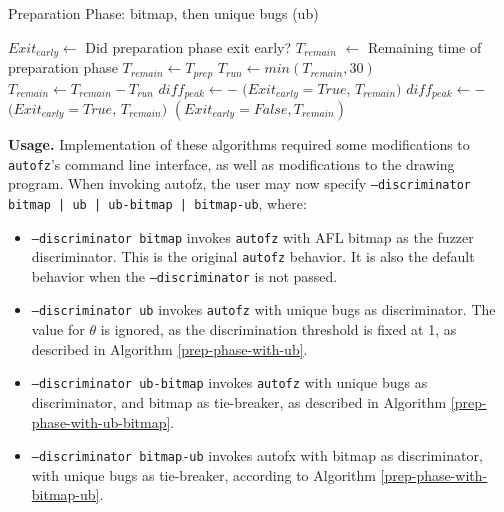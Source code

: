 \begin{algorithm}[h!]
  \caption{Preparation Phase: bitmap, then unique bugs (ub)}\label{prep-phase-with-bitmap-ub}
  \small
  \begin{algorithmic}[1]
    \Output
      \State $Exit_{early} \gets$ Did preparation phase exit early?
      \State $T_{remain}$ $\gets$ Remaining time of preparation phase
    \EndOutput
      \State $T_{remain} \gets T_{prep}$
        \State $T_{run} \gets min(T_{remain},30)$
            \State {}
          \EndFor
        \Else {}
          \State {}
        \EndIf
        \State $T_{remain} \gets T_{remain} - T_{run}$
        \State $diff_{peak} \gets $$ - $
          \State \Return $(Exit_{early}=True$, $T_{remain})$
        \Else {}
          \State $diff_{peak} \gets $$ - $
              \State \Return $(Exit_{early}=True$, $T_{remain})$
          \EndIf
        \EndIf
      \EndWhile
      \State \Return $(Exit_{early}=False, T_{remain})$
    \EndFunction
  \end{algorithmic}
\end{algorithm}

\textbf{Usage.} Implementation of these algorithms required some modifications to \texttt{autofz}'s 
command line interface, as well as modifications to the drawing program. When invoking 
autofz, the user may now specify \texttt{--discriminator bitmap | ub | ub-bitmap | bitmap-ub},
where:

\begin{itemize}
  \item \texttt{--discriminator bitmap} invokes \texttt{autofz} with AFL bitmap as the 
  fuzzer discriminator. This is the original \texttt{autofz} behavior. It is also the default behavior 
  when the \texttt{--discriminator} is not passed.
  \item \texttt{--discriminator ub} invokes \texttt{autofz} with unique bugs as discriminator. The 
  value for $\theta$ is ignored, as the discrimination threshold is fixed at 1, as described 
  in Algorithm \ref{prep-phase-with-ub}.
  \item \texttt{--discriminator ub-bitmap} invokes \texttt{autofz} with unique bugs as discriminator, 
  and bitmap as tie-breaker, as described in Algorithm \ref{prep-phase-with-ub-bitmap}.
  \item \texttt{--discriminator bitmap-ub} invokes autofx with bitmap as discriminator, 
  with unique bugs as tie-breaker, according to Algorithm \ref{prep-phase-with-bitmap-ub}.
\end{itemize}

